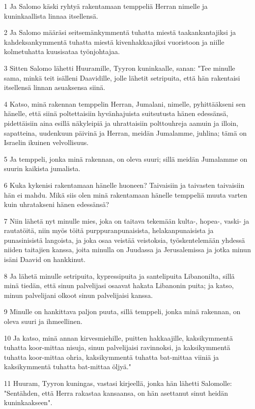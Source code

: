 \par 1 Ja Salomo käski ryhtyä rakentamaan temppeliä Herran nimelle ja kuninkaallista linnaa itsellensä.
\par 2 Ja Salomo määräsi seitsemänkymmentä tuhatta miestä taakankantajiksi ja kahdeksankymmentä tuhatta miestä kivenhakkaajiksi vuoristoon ja niille kolmetuhatta kuusisataa työnjohtajaa.
\par 3 Sitten Salomo lähetti Huuramille, Tyyron kuninkaalle, sanan: "Tee minulle sama, minkä teit isälleni Daavidille, jolle lähetit setripuita, että hän rakentaisi itsellensä linnan asuaksensa siinä.
\par 4 Katso, minä rakennan temppelin Herran, Jumalani, nimelle, pyhittääkseni sen hänelle, että siinä poltettaisiin hyvänhajuista suitsutusta hänen edessänsä, pidettäisiin aina esillä näkyleipiä ja uhrattaisiin polttouhreja aamuin ja illoin, sapatteina, uudenkuun päivinä ja Herran, meidän Jumalamme, juhlina; tämä on Israelin ikuinen velvollisuus.
\par 5 Ja temppeli, jonka minä rakennan, on oleva suuri; sillä meidän Jumalamme on suurin kaikista jumalista.
\par 6 Kuka kykenisi rakentamaan hänelle huoneen? Taivaisiin ja taivasten taivaisiin hän ei mahdu. Mikä siis olen minä rakentamaan hänelle temppeliä muuta varten kuin uhratakseni hänen edessänsä?
\par 7 Niin lähetä nyt minulle mies, joka on taitava tekemään kulta-, hopea-, vaski- ja rautatöitä, niin myös töitä purppuranpunaisista, helakanpunaisista ja punasinisistä langoista, ja joka osaa veistää veistoksia, työskentelemään yhdessä niiden taitajien kanssa, joita minulla on Juudassa ja Jerusalemissa ja jotka minun isäni Daavid on hankkinut.
\par 8 Ja lähetä minulle setripuita, kypressipuita ja santelipuita Libanonilta, sillä minä tiedän, että sinun palvelijasi osaavat hakata Libanonin puita; ja katso, minun palvelijani olkoot sinun palvelijaisi kanssa.
\par 9 Minulle on hankittava paljon puuta, sillä temppeli, jonka minä rakennan, on oleva suuri ja ihmeellinen.
\par 10 Ja katso, minä annan kirvesmiehille, puitten hakkaajille, kaksikymmentä tuhatta koor-mittaa nisuja, sinun palvelijaisi ravinnoksi, ja kaksikymmentä tuhatta koor-mittaa ohria, kaksikymmentä tuhatta bat-mittaa viiniä ja kaksikymmentä tuhatta bat-mittaa öljyä."
\par 11 Huuram, Tyyron kuningas, vastasi kirjeellä, jonka hän lähetti Salomolle: "Sentähden, että Herra rakastaa kansaansa, on hän asettanut sinut heidän kuninkaakseen".
